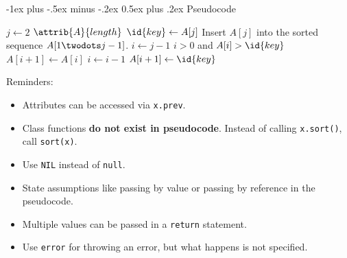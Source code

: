 \documentclass[letterpaper, 8pt]{extarticle}
\makeatletter
\renewcommand{\section}{\@startsection{section}{1}{0mm}%
                                {-1ex plus -.5ex minus -.2ex}%
                                {0.5ex plus .2ex}%
                                {\normalfont\normalsize\bfseries}}
\makeatother
\begin{document}
\begin{multicols*}{4}
  \section{Pseudocode}
  \begin{codebox}
    \li \For $j \gets 2$ \To $\attrib{A}{length}$
    \li   \Do
    $\id{key} \gets A[j]$
    \li     \Comment Insert $A[j]$ into the sorted sequence
    $A[1 \twodots j-1]$.
    \li     $i \gets j-1$
    \li     \While $i > 0$ and $A[i] > \id{key}$
    \li       \Do
    $A[i+1] \gets A[i]$
    \li         $i \gets i-1$
    \End
    \li     $A[i+1] \gets \id{key}$
    \End
  \end{codebox}
  Reminders:
  \begin{itemize}
    \item Attributes can be accessed via \verb|x.prev|.
    \item Class functions \textbf{do not exist in pseudocode}.
          Instead of calling \verb|x.sort()|, call \verb|sort(x)|.
    \item Use \verb|NIL| instead of \verb|null|.
    \item State assumptions like passing by value or passing by reference
          in the pseudocode.
    \item Multiple values can be passed in a \verb|return| statement.
    \item Use \verb|error| for throwing an error, but what happens is not specified.
  \end{itemize}

\end{multicols*}
\end{document}
